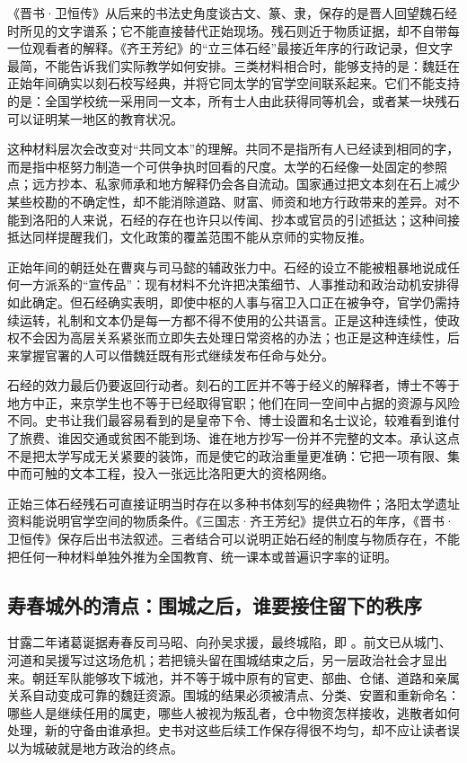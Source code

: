 《晋书·卫恒传》从后来的书法史角度谈古文、篆、隶，保存的是晋人回望魏石经时所见的文字谱系；它不能直接替代正始现场。残石则近于物质证据，却不自带每一位观看者的解释。《齐王芳纪》的“立三体石经”最接近年序的行政记录，但文字最简，不能告诉我们实际教学如何安排。三类材料相合时，能够支持的是：魏廷在正始年间确实以刻石校写经典，并将它同太学的官学空间联系起来。它们不能支持的是：全国学校统一采用同一文本，所有士人由此获得同等机会，或者某一块残石可以证明某一地区的教育状况。

这种材料层次会改变对“共同文本”的理解。共同不是指所有人已经读到相同的字，而是指中枢努力制造一个可供争执时回看的尺度。太学的石经像一处固定的参照点；远方抄本、私家师承和地方解释仍会各自流动。国家通过把文本刻在石上减少某些校勘的不确定性，却不能消除道路、财富、师资和地方行政带来的差异。对不能到洛阳的人来说，石经的存在也许只以传闻、抄本或官员的引述抵达；这种间接抵达同样提醒我们，文化政策的覆盖范围不能从京师的实物反推。

正始年间的朝廷处在曹爽与司马懿的辅政张力中。石经的设立不能被粗暴地说成任何一方派系的“宣传品”：现有材料不允许把决策细节、人事推动和政治动机安排得如此确定。但石经确实表明，即使中枢的人事与宿卫入口正在被争夺，官学仍需持续运转，礼制和文本仍是每一方都不得不使用的公共语言。正是这种连续性，使政权不会因为高层关系紧张而立即失去处理日常资格的办法；也正是这种连续性，后来掌握官署的人可以借魏廷既有形式继续发布任命与处分。

石经的效力最后仍要返回行动者。刻石的工匠并不等于经义的解释者，博士不等于地方中正，来京学生也不等于已经取得官职；他们在同一空间中占据的资源与风险不同。史书让我们最容易看到的是皇帝下令、博士设置和名士议论，较难看到谁付了旅费、谁因交通或贫困不能到场、谁在地方抄写一份并不完整的文本。承认这点不是把太学写成无关紧要的装饰，而是使它的政治重量更准确：它把一项有限、集中而可触的文本工程，投入一张远比洛阳更大的资格网络。

\begin{sourcenote}[残石与帝纪各能把我们带到哪里]
正始三体石经残石可直接证明当时存在以多种书体刻写的经典物件；洛阳太学遗址资料能说明官学空间的物质条件。《三国志·齐王芳纪》提供立石的年序，《晋书·卫恒传》保存后出书法叙述。三者结合可以说明正始石经的制度与物质存在，不能把任何一种材料单独外推为全国教育、统一课本或普遍识字率的证明。
\end{sourcenote}

\subsection{寿春城外的清点：围城之后，谁要接住留下的秩序}

甘露二年诸葛诞据寿春反司马昭、向孙吴求援，最终城陷，即
。前文已从城门、河道和吴援写过这场危机；若把镜头留在围城结束之后，另一层政治社会才显出来。朝廷军队能够攻下城池，并不等于城中原有的官吏、部曲、仓储、道路和亲属关系自动变成可靠的魏廷资源。围城的结果必须被清点、分类、安置和重新命名：哪些人是继续任用的属吏，哪些人被视为叛乱者，仓中物资怎样接收，逃散者如何处理，新的守备由谁承担。史书对这些后续工作保存得很不均匀，却不应让读者误以为城破就是地方政治的终点。

